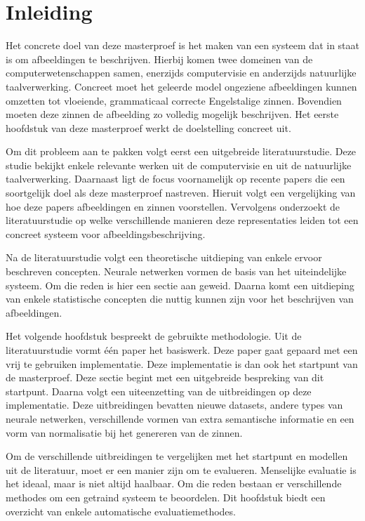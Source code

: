 \chapter{Inleiding}
\label{inleiding}

Het concrete doel van deze masterproef is het maken van een systeem dat in staat is om afbeeldingen te beschrijven. Hierbij komen twee domeinen van de computerwetenschappen samen, enerzijds computervisie en anderzijds natuurlijke taalverwerking. Concreet moet het geleerde model ongeziene afbeeldingen kunnen omzetten tot vloeiende, grammaticaal correcte Engelstalige zinnen. Bovendien moeten deze zinnen de afbeelding zo volledig mogelijk beschrijven. Het eerste hoofdstuk van deze masterproef werkt de doelstelling concreet uit.

Om dit probleem aan te pakken volgt eerst een uitgebreide literatuurstudie. Deze studie bekijkt enkele relevante werken uit de computervisie en uit de natuurlijke taalverwerking. Daarnaast ligt de focus voornamelijk op recente papers die een soortgelijk doel als deze masterproef nastreven. Hieruit volgt een vergelijking van hoe deze papers afbeeldingen en zinnen voorstellen. Vervolgens onderzoekt de literatuurstudie op welke verschillende manieren deze representaties leiden tot een concreet systeem voor afbeeldingsbeschrijving.

Na de literatuurstudie volgt een theoretische uitdieping van enkele ervoor beschreven concepten. Neurale netwerken vormen de basis van het uiteindelijke systeem. Om die reden is hier een sectie aan geweid. Daarna komt een uitdieping van enkele statistische concepten die nuttig kunnen zijn voor het beschrijven van afbeeldingen.

Het volgende hoofdstuk bespreekt de gebruikte methodologie.
Uit de literatuurstudie vormt \'e\'en paper het basiswerk. Deze paper gaat gepaard met een vrij te gebruiken implementatie. Deze implementatie is dan ook het startpunt van de masterproef. Deze sectie begint met een uitgebreide bespreking van dit startpunt.
Daarna volgt een uiteenzetting van de uitbreidingen op deze implementatie. Deze uitbreidingen bevatten nieuwe datasets, andere types van neurale netwerken, verschillende vormen van extra semantische informatie en een vorm van normalisatie bij het genereren van de zinnen.

Om de verschillende uitbreidingen te vergelijken met het startpunt en modellen uit de literatuur, moet er een manier zijn om te evalueren. Menselijke evaluatie is het ideaal, maar is niet altijd haalbaar. Om die reden bestaan er verschillende methodes om een getraind systeem te beoordelen. Dit hoofdstuk biedt een overzicht van enkele automatische evaluatiemethodes.

